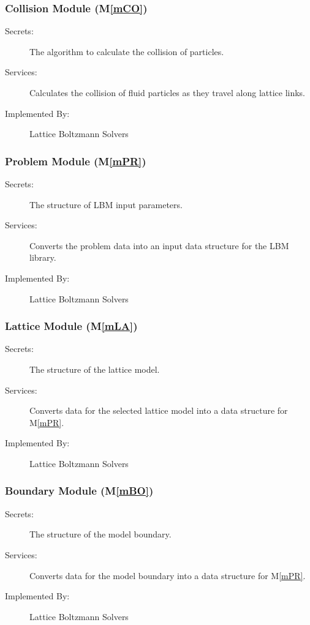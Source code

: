 \documentclass[12pt, titlepage]{article}
\newcommand{\mref}[1]{M\ref{#1}}
\newcommand{\famname}{Lattice Boltzmann Solvers} %
\begin{document}
\subsubsection{Collision Module (\mref{mCO})}

\begin{description}
	\item[Secrets:]The algorithm to calculate the collision of particles.
	\item[Services:]Calculates the collision of fluid particles as they travel along lattice links.
	\item[Implemented By:] \famname
\end{description}

\subsubsection{Problem Module (\mref{mPR})}

\begin{description}
	\item[Secrets:]The structure of LBM input parameters.
	\item[Services:]Converts the problem data into an input data structure for the LBM library.
	\item[Implemented By:] \famname
\end{description}

\subsubsection{Lattice Module (\mref{mLA})}

\begin{description}
	\item[Secrets:]The structure of the lattice model.
	\item[Services:]Converts data for the selected lattice model into a data structure for \mref{mPR}.
	\item[Implemented By:] \famname
\end{description}

\subsubsection{Boundary Module (\mref{mBO})}

\begin{description}
	\item[Secrets:]The structure of the model boundary.
	\item[Services:]Converts data for the model boundary into a data structure for \mref{mPR}.
	\item[Implemented By:] \famname
\end{description}
\end{document}

